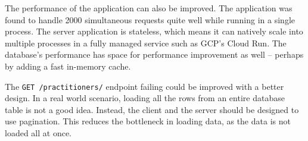 The performance of the application can also be improved.
The application was found to handle 2000 simultaneous requests quite well while running in a single process.
The server application is stateless, which means it can natively scale into multiple processes in a fully managed service such as GCP’s Cloud Run.
The database’s performance has space for performance improvement as well -- perhaps by adding a fast in-memory cache.

The \texttt{GET /practitioners/} endpoint failing could be improved with a better design.
In a real world scenario, loading all the rows from an entire database table is not a good idea.
Instead, the client and the server should be designed to use pagination.
This reduces the bottleneck in loading data, as the data is not loaded all at once.
